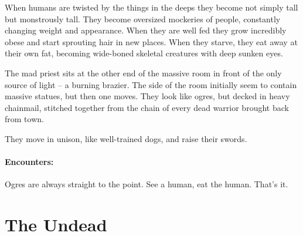 \begin{multicols}{2}
When humans are twisted by the things in the deeps they become not simply tall but monstrously tall.
They become oversized mockeries of people, constantly changing weight and appearance.
When they are well fed they grow incredibly obese and start sprouting hair in new places.
When they starve, they eat away at their own fat, becoming wide-boned skeletal creatures with deep sunken eyes.


\begin{boxtext}

	The mad priest sits at the other end of the massive room in front of the only source of light -- a burning brazier.
	The side of the room initially seem to contain massive statues, but then one moves.
	They look like ogres, but decked in heavy chainmail, stitched together from the chain of every dead warrior brought back from town.

	They move in unison, like well-trained dogs, and raise their swords.

\end{boxtext}

\paragraph{Encounters:}

Ogres are always straight to the point.
See a human, eat the human.
That's it.

\end{multicols}

\section{The Undead}

